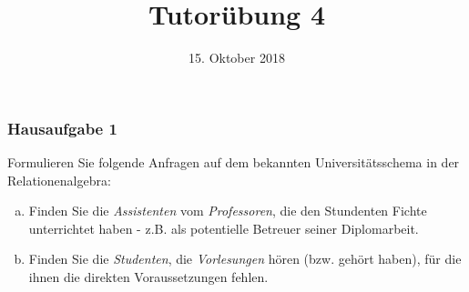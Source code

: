 %
% 
% 
%







\newcommand{\Datum}{\today}

\renewcommand{\PraesentationFusszeileZusatz}{| Tutorium Grundlagen: Datenbanken WS 18/19}

\title{Tutorübung 4}
\author{\PersonVorname{} \PersonNachname}
\institute[]{\UniversitaetName \\ \FakultaetName}
\date[\Datum]{15. Oktober 2018}



\setlength{\baselineskip}{\PraesentationAbstandAbsatz}
\setlength{\parskip}{\baselineskip}

\PraesentationMasterStandard

\PraesentationTitelseite %

\begin{frame}
	\frametitle{Hausaufgabe 1}
	\vspace{0.25cm}

	Formulieren Sie folgende Anfragen auf dem bekannten Universitätsschema in der Relationenalgebra:
	\begin{enumerate}[a)]
		\item Finden Sie die \textit{Assistenten} vom \textit{Professoren}, die den Stundenten Fichte unterrichtet haben -
		      z.B. als potentielle Betreuer seiner Diplomarbeit.
		\item Finden Sie die \textit{Studenten}, die \textit{Vorlesungen} hören (bzw. gehört haben), für die ihnen
		      die direkten Voraussetzungen fehlen.
	\end{enumerate}
\end{frame}

